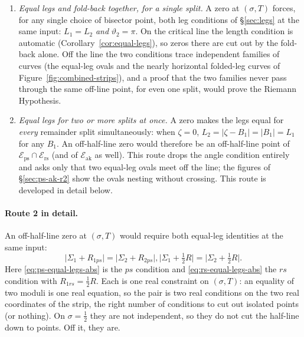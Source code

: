 \documentclass[11pt]{article}
\theoremstyle{definition}
\begin{document}
\begin{enumerate}
\item \emph{Equal legs and fold-back together, for a single split.}
A zero at $(\sigma,T)$ forces, for any single choice of bisector point, both
leg conditions of \S\ref{sec:legs} at the same input: $L_1=L_2$ \emph{and}
$\vartheta_2=\pi$. On the critical line the length condition is automatic
(Corollary~\ref{cor:equal-legs}), so zeros there are cut out by the fold-back
alone. Off the line the two conditions trace independent families of curves
(the equal-leg ovals and the nearly horizontal folded-leg curves of
Figure~\ref{fig:combined-strips}), and a proof that the two families never
pass through the same off-line point, for even one split, would prove the
Riemann Hypothesis.

\item \emph{Equal legs for two or more splits at once.}
A zero makes the legs equal for \emph{every} remainder split simultaneously: when
$\zeta=0$, $L_2=|\zeta-B_1|=|B_1|=L_1$ for any $B_1$. An off-half-line zero
would therefore be an off-half-line point of
$\mathcal{E}_{\mathrm{ps}}\cap\mathcal{E}_{\mathrm{rs}}$ (and of
$\mathcal{E}_{\mathrm{ak}}$ as well). This route drops the angle condition
entirely and asks only that two equal-leg ovals meet off the line; the
figures of \S\ref{sec:ps-ak-r2} show the ovals nesting without crossing.
This route is developed in detail below.
\end{enumerate}

\paragraph{Route 2 in detail.}
An off-half-line zero at $(\sigma,T)$ would require both equal-leg
identities at the same input:
\begin{subequations}\label{eq:equal-legs-abs}
\begin{equation}\label{eq:ps-equal-legs-abs}
\bigl|\Sigma_1+R_{1ps}\bigr|
=
\bigl|\Sigma_2+R_{2ps}\bigr|,
\end{equation}
\begin{equation}\label{eq:rs-equal-legs-abs}
\bigl|\Sigma_1+\tfrac12 R\bigr|
=
\bigl|\Sigma_2+\tfrac12 R\bigr|.
\end{equation}
\end{subequations}
Here \eqref{eq:ps-equal-legs-abs} is the $ps$ condition and
\eqref{eq:rs-equal-legs-abs} the $rs$ condition with $R_{1rs}=\tfrac12 R$.
Each is one real constraint on $(\sigma,T)$: an equality of two moduli is
one real equation, so the pair is two real conditions on the two real
coordinates of the strip, the right number of conditions to cut out isolated points (or
nothing).
On $\sigma=\tfrac12$ they are not independent, so they do not cut the
half-line down to points. Off it, they are.
\end{document}
